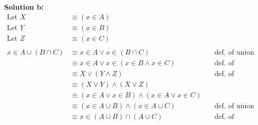 \textbf{Solution b:}
\begin{align*}
\text{Let } X &\equiv (x \in A) \\
\text{Let } Y &\equiv (x \in B) \\
\text{Let } Z &\equiv (x \in C) \\ \\
x \in A \cup (B \cap C) &\equiv x \in A \vee x \in (B \cap C) &\quad \text{def. of union} & \\
&\equiv x \in A \vee x \in (x \in B \wedge x \in C) &\quad \text{def. of intersection} & \\
&\equiv X \vee (Y \wedge Z) &\quad \text{def. of intersection} & \\
&\equiv (X \vee Y) \wedge (X \vee Z) &\quad \text{} & \\
&\equiv (x \in A \vee x \in B) \wedge (x \in A \vee x \in C) &\quad \text{} & \\
&\equiv (x \in A \cup B) \wedge (x \in A \cup C) &\quad \text{def. of union} & \\
&\equiv x \in (A \cup B) \cap (A \cup C) &\quad \text{def. of intersection} & \\
\end{align*}

